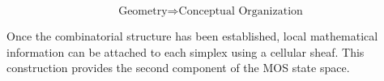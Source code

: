 
\begin{eqbox}

\[
\boxed{
\text{Geometry}
\Longrightarrow
\text{Conceptual Organization}
}
\]

\vspace{2mm}

\BodyFont

Once the combinatorial structure has been established, local mathematical
information can be attached to each simplex using a cellular sheaf. This
construction provides the second component of the MOS state space.

\end{eqbox}